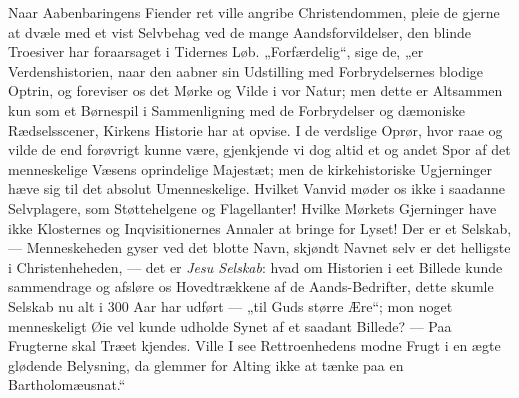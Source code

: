 \documentclass[12pt,a4paper]{book}
\begin{document}
Naar Aabenbaringens Fiender ret ville angribe Christendommen, pleie de gjerne at dvæle
med et vist Selvbehag ved de mange Aandsforvildelser, den blinde Troesiver har
foraarsaget i Tidernes Løb. „Forfærdelig“, sige de, „er Verdenshistorien, naar den
aabner sin Udstilling med Forbrydelsernes blodige Optrin, og foreviser os det Mørke og
Vilde i vor Natur; men dette er Altsammen kun som et Børnespil i Sammenligning med de
Forbrydelser og dæmoniske Rædselsscener, Kirkens Historie har at opvise. I de verdslige
Oprør, hvor raae og vilde de end forøvrigt kunne være, gjenkjende vi dog altid et og
andet Spor af det menneskelige Væsens oprindelige Majestæt; men de kirkehistoriske
Ugjerninger hæve sig til det absolut Umenneskelige. Hvilket Vanvid møder os ikke i
saadanne Selvplagere, som Støttehelgene og Flagellanter! Hvilke Mørkets Gjerninger have
ikke Klosternes og Inqvisitionernes Annaler at bringe for Lyset! Der er et Selskab, ---
Menneskeheden gyser ved det blotte Navn, skjøndt Navnet selv er det helligste i
Christenheheden, --- det er \emph{Jesu Selskab}: hvad om Historien i eet Billede kunde
sammendrage og afsløre os Hovedtrækkene af de Aands-Bedrifter, dette skumle Selskab nu
alt i 300 Aar har udført --- „til Guds større Ære“; mon noget menneskeligt Øie vel kunde
udholde Synet af et saadant Billede? --- Paa Frugterne skal Træet kjendes. Ville I see
Rettroenhedens modne Frugt i en ægte glødende Belysning, da glemmer for Alting ikke at
tænke paa en Bartholomæusnat.“
\end{document}
